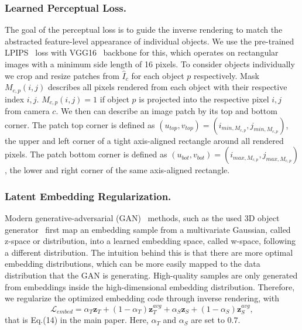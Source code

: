 
\subsubsection{Learned Perceptual Loss.}
The goal of the perceptual loss is to guide the inverse rendering to match the abstracted feature-level appearance of individual objects. We use the pre-trained LPIPS~\cite{zhang2018perceptual} loss with VGG16~\cite{simonyan2015deep} backbone for this, which operates on rectangular images with a minimum side length of 16 pixels. To consider objects individually we crop and resize patches from $\hat I_c$ for each object $p$ respectively. Mask $M_{c,p} (i, j)$ describes all pixels rendered from each object with their respective index $i, j$. $M_{c,p} (i, j) = 1$ if object $p$ is projected into the respective pixel $i,j$ from camera $c$. We then can describe an image patch by its top and bottom corner. The patch top corner is defined as $\left( u_{top}, v_{top}\right) = \left( i_{min, M_{c,p}}, j_{min, M_{c,p}}\right)$, the upper and left corner of a tight axis-aligned rectangle around all rendered pixels. The patch bottom corner is defined as $\left( u_{bot}, v_{bot}\right) = \left( i_{max, M_{c,p}}, j_{max, M_{c,p}}\right)$, the lower and right corner of the same axis-aligned rectangle. \\
\subsubsection{Latent Embedding Regularization.}
%
Modern generative-adversarial (GAN)~\cite{karras2019styleGAN,karras2020styleGAN2,gao2022get3d,sauer2022styleganXL,kang2023gigaGAN} methods, such as the used 3D object generator~\cite{gao2022get3d} first map an embedding sample from a multivariate Gaussian, called z-space or distribution, into a learned embedding space, called w-space, following a different distribution. The intuition behind this is that there are more optimal embedding distributions, which can be more easily mapped to the data distribution that the GAN is generating. High-quality samples are only generated from embeddings inside the high-dimensional embedding distribution. Therefore, we regularize the optimized embedding code through inverse rendering, with
\begin{equation}
    \mathcal{L}_{embed} = \alpha_T\mathbf{z}_T + (1 - \alpha_T)\mathbf{z}_T^{avg} +  \alpha_S\mathbf{z}_S + (1 - \alpha_S)\mathbf{z}_S^{avg},
\end{equation}
that is Eq.(14) in the main paper. Here, $\alpha_T$ and $\alpha_S$ are set to $0.7$.

